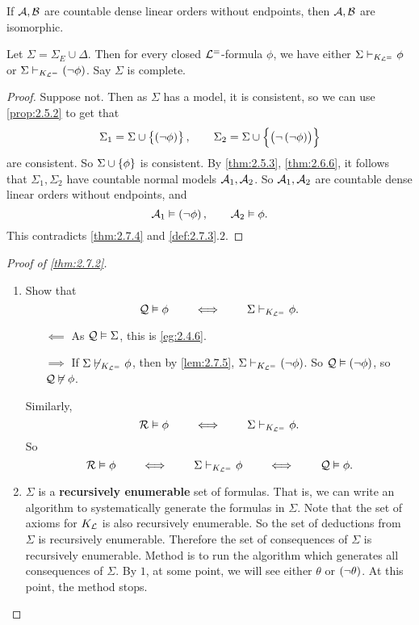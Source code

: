 \begin{theorem}[Cantor]
\label{thm:2.7.4}
If $ \AA, \BB $ are countable dense linear orders without endpoints, then $ \AA, \BB $ are isomorphic.
\end{theorem}

\begin{lemma}
\label{lem:2.7.5}
Let $ \Sigma = \Sigma_E \cup \Delta $. Then for every closed $ \LL^= $-formula $ \phi $, we have either $ \Sigma \vdash_{K_{\LL^=}} \phi $ or $ \Sigma \vdash_{K_{\LL^=}} \notb{\phi} $. Say $ \Sigma $ is complete.
\end{lemma}

\begin{proof}
Suppose not. Then as $ \Sigma $ has a model, it is consistent, so we can use \ref{prop:2.5.2} to get that
$$ \Sigma_1 = \Sigma \cup \cbr{\notb{\phi}}, \qquad \Sigma_2 = \Sigma \cup \cbr{\notb{\notb{\phi}}} $$
are consistent. So $ \Sigma \cup \cbr{\phi} $ is consistent. By \ref{thm:2.5.3}, \ref{thm:2.6.6}, it follows that $ \Sigma_1, \Sigma_2 $ have countable normal models $ \AA_1, \AA_2 $. So $ \AA_1, \AA_2 $ are countable dense linear orders without endpoints, and
$$ \AA_1 \vDash \notb{\phi}, \qquad \AA_2 \vDash \phi. $$
This contradicts \ref{thm:2.7.4} and \ref{def:2.7.3}.$ 2 $.
\end{proof}

\begin{proof}[Proof of \ref{thm:2.7.2}]
\hfill
\begin{enumerate}
\item Show that
$$ \QQ \vDash \phi \qquad \iff \qquad \Sigma \vdash_{K_{\LL^=}} \phi. $$
\begin{itemize}
\item[$ \impliedby $] As $ \QQ \vDash \Sigma $, this is \ref{eg:2.4.6}.
\item[$ \implies $] If $ \Sigma \not\vdash_{K_{\LL^=}} \phi $, then by \ref{lem:2.7.5}, $ \Sigma \vdash_{K_{\LL^=}} \notb{\phi} $. So $ \QQ \vDash \notb{\phi} $, so $ \QQ \not\vDash \phi $.
\end{itemize}
Similarly,
$$ \RR \vDash \phi \qquad \iff \qquad \Sigma \vdash_{K_{\LL^=}} \phi. $$
So
$$ \RR \vDash \phi \qquad \iff \qquad \Sigma \vdash_{K_{\LL^=}} \phi \qquad \iff \qquad \QQ \vDash \phi. $$
\item $ \Sigma $ is a \textbf{recursively enumerable} set of formulas. That is, we can write an algorithm to systematically generate the formulas in $ \Sigma $. Note that the set of axioms for $ K_\LL $ is also recursively enumerable. So the set of deductions from $ \Sigma $ is recursively enumerable. Therefore the set of consequences of $ \Sigma $ is recursively enumerable. Method is to run the algorithm which generates all consequences of $ \Sigma $. By $ 1 $, at some point, we will see either $ \theta $ or $ \notb{\theta} $. At this point, the method stops.
\end{enumerate}
\end{proof}

